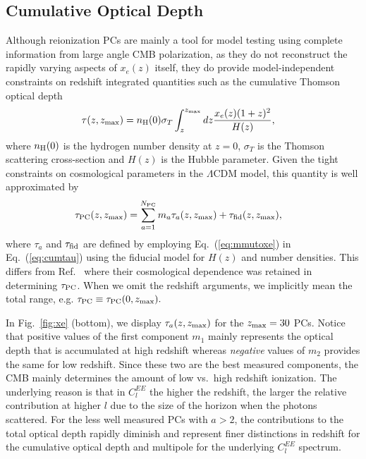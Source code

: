 \documentclass[aps,prd,twocolumn,amsmath,amssymb,showpacs,floatfix,superscriptaddress,nofootinbib]{revtex4-1}
\newcommand{\zmax}{z_{\rm max}}
\begin{document}
%
%
%
%
\subsection{Cumulative Optical Depth}
\label{sec:cumulative}

Although reionization PCs are mainly a tool for model testing using complete information from large angle CMB polarization, as they do not reconstruct the rapidly varying aspects of $x_e(z)$ itself, they do provide model-independent constraints on redshift integrated quantities such as  the cumulative Thomson optical depth
\begin{align}
\tau(z,z_{\rm max}) & = n_{\rm H}(0) \sigma_T \int_z^{z_{\rm max}} dz \frac{x_e(z) (1+z)^{2} }{H(z)},
\label{eq:cumtau}
\end{align}
where $n_{\rm H}(0)$ is the hydrogen number density at $z=0$, $\sigma_T$ is the Thomson scattering cross-section and $H(z)$ is the Hubble parameter. 
Given the tight constraints on cosmological parameters in the $\Lambda$CDM model, this quantity is well approximated by
\begin{align}
\tau_{\rm PC}(z,z_{\rm max})& = \sum_{a=1}^{N_{\rm PC}} m_a \tau_a(z,z_{\rm max}) + \tau_{\rm fid}(z,z_{\rm max}),
\label{eq:cumtauPC}
\end{align}
where $\tau_a$ and $\tau_{\rm fid}$ are defined by employing Eq.~({\ref{eq:mmutoxe}}) in
Eq.~(\ref{eq:cumtau}) using the fiducial model 
for $H(z)$ and number densities.  This differs from Ref.~\cite{Heinrich:2016ojb} where their cosmological dependence was retained in determining $\tau_{\rm PC}$.
 When we omit the redshift arguments, we
implicitly mean the total range, e.g. 
 $
 \tau_{\rm PC}\equiv \tau_{\rm PC}(0,z_{\rm max}).
 $
 
 In Fig.~\ref{fig:xe} (bottom), we display $\tau_a(z,z_{\rm max})$ for the $\zmax=30$ PCs.
 Notice that positive values of the first component $m_1$ mainly represents the optical depth that is accumulated at high redshift whereas {\it negative} values of $m_2$ provides the same for low redshift.    Since these two are the best measured components, the CMB mainly determines the amount of low vs.~high redshift ionization.
The underlying reason is that in $C_l^{EE}$ the higher the redshift, the
larger the relative contribution at higher $l$ due to the size of the horizon when the photons scattered.  For the less well measured PCs with $a>2$, the contributions to the total optical depth rapidly diminish and represent finer distinctions in redshift for the cumulative optical depth and multipole for the underlying $C_l^{EE}$ spectrum.
\end{document}
